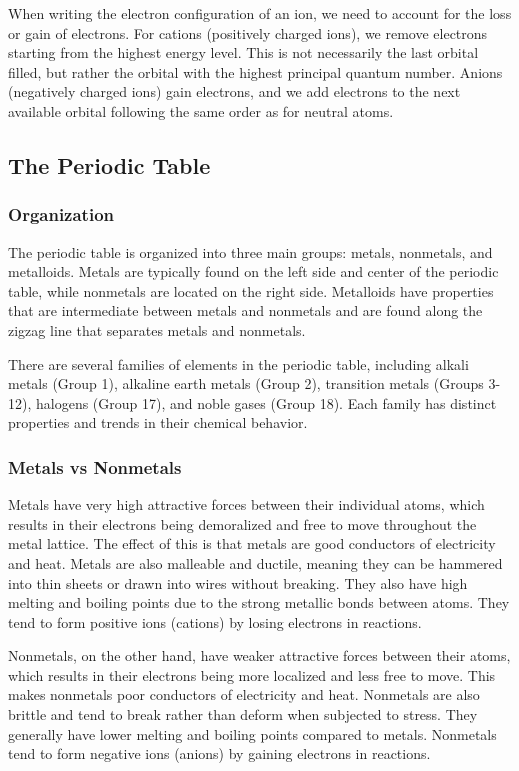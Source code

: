 When writing the electron configuration of an ion, we need to account for the loss or gain of electrons. For cations (positively charged ions), we remove electrons starting from the highest energy level. This is not necessarily the last orbital filled, but rather the orbital with the highest principal quantum number. Anions (negatively charged ions) gain electrons, and we add electrons to the next available orbital following the same order as for neutral atoms. 
\subsection{The Periodic Table}
\subsubsection{Organization}
The periodic table is organized into three main groups: metals, nonmetals, and metalloids. Metals are typically found on the left side and center of the periodic table, while nonmetals are located on the right side. Metalloids have properties that are intermediate between metals and nonmetals and are found along the zigzag line that separates metals and nonmetals.

There are several families of elements in the periodic table, including alkali metals (Group 1), alkaline earth metals (Group 2), transition metals (Groups 3-12), halogens (Group 17), and noble gases (Group 18). Each family has distinct properties and trends in their chemical behavior.
\subsubsection{Metals vs Nonmetals}
Metals have very high attractive forces between their individual atoms, which results in their electrons being demoralized and free to move throughout the metal lattice. The effect of this is that metals are good conductors of electricity and heat. Metals are also malleable and ductile, meaning they can be hammered into thin sheets or drawn into wires without breaking. They also have high melting and boiling points due to the strong metallic bonds between atoms. They tend to form positive ions (cations) by losing electrons in reactions.

Nonmetals, on the other hand, have weaker attractive forces between their atoms, which results in their electrons being more localized and less free to move. This makes nonmetals poor conductors of electricity and heat. Nonmetals are also brittle and tend to break rather than deform when subjected to stress. They generally have lower melting and boiling points compared to metals. Nonmetals tend to form negative ions (anions) by gaining electrons in reactions.
